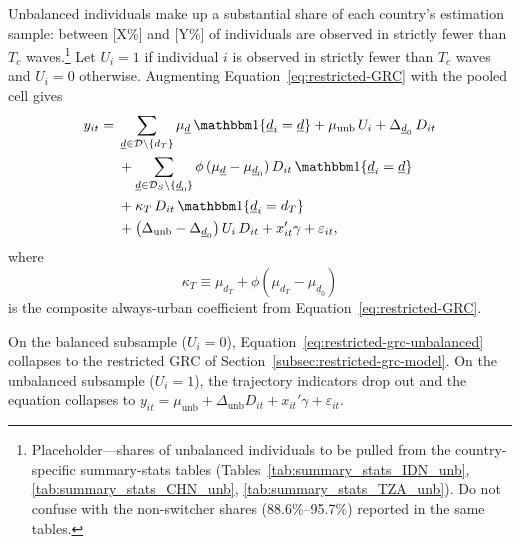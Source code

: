 Unbalanced individuals make up a substantial share of each country's estimation sample: between [X\%] and [Y\%] of individuals are observed in strictly fewer than $T_c$ waves.\footnote{Placeholder---shares of unbalanced individuals to be pulled from the country-specific summary-stats tables (Tables~\ref{tab:summary_stats_IDN_unb}, \ref{tab:summary_stats_CHN_unb}, \ref{tab:summary_stats_TZA_unb}). Do not confuse with the non-switcher shares (88.6\%--95.7\%) reported in the same tables.}
Let $U_i=1$ if individual $i$ is observed in strictly fewer than $T_c$ waves and $U_i=0$ otherwise.
Augmenting Equation~\eqref{eq:restricted-GRC} with the pooled cell gives
\begin{equation}
\label{eq:restricted-grc-unbalanced}
\begin{aligned}
y_{it} =\; &
\sum_{\underline d \in \mathcal D \setminus \{d_T\}}
    \mu_{\underline d}\,\mathbbm 1\{\underline d_i=\underline d\}
+ \mu_{\mathrm{unb}}\,U_i
+ \Delta_{\underline d_0}\,D_{it} \\
& + \sum_{\underline d \in \mathcal D_S \setminus \{\underline d_0\}}
    \phi\,(\mu_{\underline d}-\mu_{\underline d_0})\,D_{it}\,
    \mathbbm 1\{\underline d_i=\underline d\} \\
& + \kappa_T\,D_{it}\,
    \mathbbm 1\{\underline d_i=d_T\} \\
& + \big(\Delta_{\mathrm{unb}}-\Delta_{\underline d_0}\big)\,U_i\,D_{it}
+ x_{it}'\gamma + \varepsilon_{it},
\end{aligned}
\end{equation}
where
\begin{equation}
\label{eq:kappa-T}
\kappa_T \equiv \mu_{d_T} + \phi(\mu_{d_T}-\mu_{\underline d_0})
\end{equation}
is the composite always-urban coefficient from Equation~\eqref{eq:restricted-GRC}.

On the balanced subsample ($U_i=0$), Equation~\eqref{eq:restricted-grc-unbalanced} collapses to the restricted GRC of Section~\ref{subsec:restricted-grc-model}.
On the unbalanced subsample ($U_i=1$), the trajectory indicators drop out and the equation collapses to $y_{it} = \mu_{\mathrm{unb}} + \Delta_{\mathrm{unb}} D_{it} + x_{it}'\gamma + \varepsilon_{it}$.

